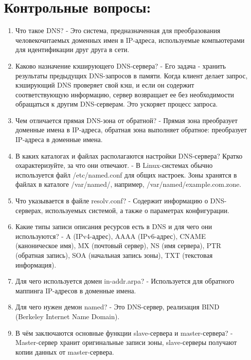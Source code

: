 \documentclass[
  12pt,
  a4paper,
  DIV=11,
  numbers=noendperiod]{scrreprt}
\begin{document}
\chapter{Контрольные
вопросы:}\label{ux43aux43eux43dux442ux440ux43eux43bux44cux43dux44bux435-ux432ux43eux43fux440ux43eux441ux44b}

\begin{enumerate}
\def\labelenumi{\arabic{enumi}.}
\item
  Что такое DNS? - Это система, предназначенная для преобразования
  человекочитаемых доменных имен в IP-адреса, используемые компьютерами
  для идентификации друг друга в сети.
\item
  Каково назначение кэширующего DNS-сервера? - Его задача - хранить
  результаты предыдущих DNS-запросов в памяти. Когда клиент делает
  запрос, кэширующий DNS проверяет свой кэш, и если он содержит
  соответствующую информацию, сервер возвращает ее без необходимости
  обращаться к другим DNS-серверам. Это ускоряет процесс запроса.
\item
  Чем отличается прямая DNS-зона от обратной? - Прямая зона преобразует
  доменные имена в IP-адреса, обратная зона выполняет обратное:
  преобразует IP-адреса в доменные имена.
\item
  В каких каталогах и файлах располагаются настройки DNS-сервера? Кратко
  охарактеризуйте, за что они отвечают. - В Linux-системах обычно
  используется файл /etc/named.conf для общих настроек. Зоны хранятся в
  файлах в каталоге /var/named/, например, /var/named/example.com.zone.
\item
  Что указывается в файле resolv.conf? - Содержит информацию о DNS-
  серверах, используемых системой, а также о параметрах конфигурации.
\item
  Какие типы записи описания ресурсов есть в DNS и для чего они
  используются? - A (IPv4-адрес), AAAA (IPv6-адрес), CNAME (каноническое
  имя), MX (почтовый сервер), NS (имя сервера), PTR (обратная запись),
  SOA (начальная запись зоны), TXT (текстовая информация).
\item
  Для чего используется домен in-addr.arpa? - Используется для обратного
  маппинга IP-адресов в доменные имена.
\item
  Для чего нужен демон named? - Это DNS-сервер, реализация BIND
  (Berkeley Internet Name Domain).
\item
  В чём заключаются основные функции slave-сервера и master-сервера? -
  Master-сервер хранит оригинальные записи зоны, slave-серверы получают
  копии данных от master-сервера.

\end{enumerate}
\end{document}
